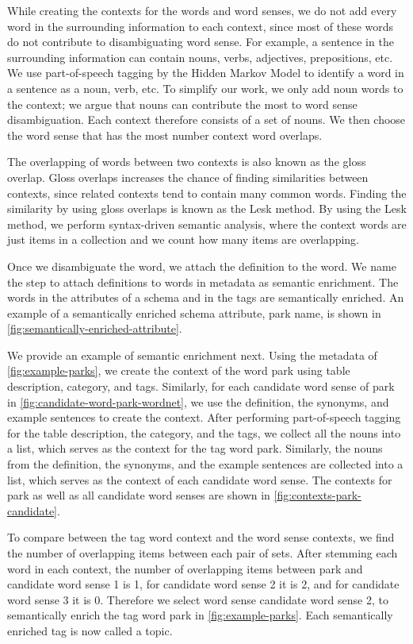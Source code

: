 While creating the contexts for the words and word senses, we do not add every word in the surrounding information to each context, since most of these words do not contribute to disambiguating word sense. For example, a sentence in the surrounding information can contain nouns, verbs, adjectives, prepositions, etc. We use part-of-speech tagging by the Hidden Markov Model to identify a word in a sentence as a noun, verb, etc. To simplify our work, we only add noun words to the context; we argue that nouns can contribute the most to word sense disambiguation. Each context therefore consists of a set of nouns. We then choose the word sense that has the most number context word overlaps.

The overlapping of words between two contexts is also known as the gloss overlap. Gloss overlaps increases the chance of finding similarities between contexts, since related contexts tend to contain many common words. Finding the similarity by using gloss overlaps is known as the Lesk method. By using the Lesk method, we perform syntax-driven semantic analysis, where the context words are just items in a collection and we count how many items are overlapping.

Once we disambiguate the word, we attach the definition to the word. We name the step to attach definitions to words in metadata as semantic enrichment. The words in the attributes of a schema and in the tags are semantically enriched. An example of a semantically enriched schema attribute, park name, is shown in \autoref{fig:semantically-enriched-attribute}.

We provide an example of semantic enrichment next. Using the metadata of \autoref{fig:example-parks}, we create the context of the word park using table description, category, and tags. Similarly, for each candidate word sense of park in \autoref{fig:candidate-word-park-wordnet}, we use the definition, the synonyms, and example sentences to create the context. After performing part-of-speech tagging for the table description, the category, and the tags, we collect all the nouns into a list, which serves as the context for the tag word park. Similarly, the nouns from the definition, the synonyms, and the example sentences are collected into a list, which serves as the context of each candidate word sense. The contexts for park as well as all candidate word senses are shown in \autoref{fig:contexts-park-candidate}.

To compare between the tag word context and the word sense contexts, we find the number of overlapping items between each pair of sets. After stemming each word in each context, the number of overlapping items between park and candidate word sense 1 is 1, for candidate word sense 2 it is 2, and for candidate word sense 3 it is 0. Therefore we select word sense candidate word sense 2, to semantically enrich the tag word park in \autoref{fig:example-parks}. Each semantically enriched tag is now called a topic.

